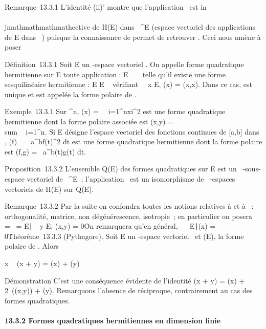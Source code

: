 Remarque~13.3.1 L'identité (ii)' montre que l'application
\phi\mapsto~\Phi est in\\\\jmathmathmathmathective de H(E) dans ~^E
(espace vectoriel des applications de E dans ~) puisque la connaissance
de \Phi permet de retrouver \phi. Ceci nous amène à poser

Définition~13.3.1 Soit E un -espace vectoriel . On appelle forme
quadratique hermitienne sur E toute application \Phi : E \rightarrow~ ~ telle qu'il
existe une forme sesquilinéaire hermitienne \phi : E \times E \rightarrow~  vérifiant
\forall~~x \in E, \Phi(x) = \phi(x,x). Dans ce cas, \phi est
unique et est appelée la forme polaire de \Phi.

Exemple~13.3.1 Sur ^n, \Phi(x) =\
\sum ~
i=1^n\textbar{}xi\textbar{}^2 est
une forme quadratique hermitienne dont la forme polaire associée est
\phi(x,y) = \\sum ~
i=1^n\overlinexiyi.
Si E désigne l'espace vectoriel des fonctions continues de {[}a,b{]}
dans \mathbb{C}, \Phi(f) =\int ~
a^b\textbar{}f(t)\textbar{}^2 dt est une forme
quadratique hermitienne dont la forme polaire est \phi(f,g)
=\int ~
a^b\overlinef(t)g(t) dt.

Proposition~13.3.2 L'ensemble Q(E) des formes quadratiques sur E est un
~-sous-espace vectoriel de ~^E~; l'application
\phi\mapsto~\Phi est un isomorphisme de \mathbb{R}~-espaces
vectoriels de H(E) sur Q(E).

Remarque~13.3.2 Par la suite on confondra toutes les notions relatives à
\phi et à \Phi~: orthogonalité, matrice, non dégénérescence, isotropie~; en
particulier on posera
\mathrmKer~\Phi
= \mathrmKer~\phi =
\x \in
E∣\forall~~y \in E, \phi(x,y) =
0\. On remarquera qu'en général,
\mathrmKer\Phi\mathrel\neq~~\x
\in E∣\Phi(x) = 0\.

Théorème~13.3.3 (Pythagore). Soit E un -espace vectoriel ~et \Phi \inQ(E), \phi
la forme polaire de \Phi. Alors

x \bot\phiy \rigtharrow~ \Phi(x + y) = \Phi(x) + \Phi(y)

Démonstration C'est une conséquence évidente de l'identité \Phi(x + y) =
\Phi(x) + 2\mathrmRe~(\phi(x,y)) +
\Phi(y). Remarquons l'absence de réciproque, contrairement au cas des
formes quadratiques.

\paragraph{13.3.2 Formes quadratiques hermitiennes en dimension finie}

